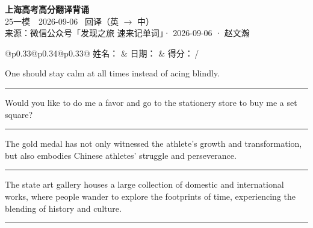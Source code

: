 \documentclass[11pt,a4paper]{article}
\newcommand{\num}[1]{\makebox[1.9em][r]{#1.}\hspace{0.3em}}
\newcommand{\wline}{\noindent\rule{\linewidth}{0.4pt}}
\begin{document}
\pagestyle{plain}
\begin{center}
{\LARGE\bfseries 上海高考高分翻译背诵 }\\[0.25em]
{\large 25一模　2026-09-06 \quad\ 回译（英 $\to$ 中）}\\[0.35em]
{\footnotesize 来源：微信公众号「发现之旅 速来记单词」· 2026-09-06 · 赵文瀚}
\end{center}

\vspace{0.4em}
\noindent\begin{tabular}{@{}p{0.33\textwidth}@{}p{0.34\textwidth}@{}p{0.33\textwidth}@{}}
姓名：\underline{\hspace{2.0cm}} & 日期：\underline{\hspace{2.0cm}} & 得分：\underline{\hspace{1.4cm}}\,/ \\
\end{tabular}

\vspace{0.5em}

\vspace{0.8em}
\num{1}One should stay calm at all times instead of acing blindly.

\vspace{0.25em}

\wline

\num{2}Would you like to do me a favor and go to the stationery store to buy me a set square?

\vspace{0.25em}

\wline

\num{3}The gold medal has not only witnessed the athlete’s growth and transformation, but also embodies Chinese athletes’ struggle and perseverance.

\vspace{0.25em}

\wline

\num{4}The state art gallery houses a large collection of domestic and international works, where people wander to explore the footprints of time, experiencing the blending of history and culture.

\vspace{0.25em}

\wline
\end{document}
